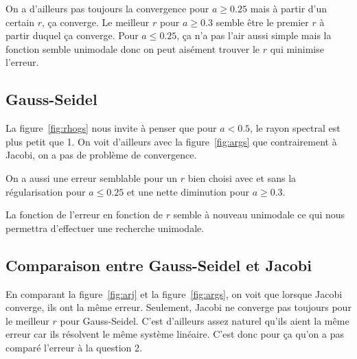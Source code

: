 On a d'ailleurs pas toujours la convergence pour $a \geq 0.25$ mais à partir
d'un certain $r$, ça converge.
Le meilleur $r$ pour $a \geq 0.3$ semble être le premier $r$ à partir duquel
ça converge.
Pour $a \leq 0.25$, ça n'a pas l'air aussi simple mais la fonction semble
unimodale donc on peut aisément trouver le $r$ qui minimise l'erreur.

\subsection{Gauss-Seidel}
La figure~\ref{fig:rhogs} nous invite à penser que pour
$a < 0.5$, le rayon spectral est plus petit que 1.
On voit d'ailleurs avec la figure~\ref{fig:args} que contrairement
à Jacobi, on a pas de problème de convergence.

On a aussi une erreur semblable pour un $r$ bien choisi
avec et sans la régularisation pour $a \leq 0.25$ et une nette
diminution pour $a \geq 0.3$.

La fonction de l'erreur en fonction de $r$ semble à nouveau unimodale
ce qui nous permettra d'effectuer une recherche unimodale.

\subsection{Comparaison entre Gauss-Seidel et Jacobi}
En comparant la figure~\ref{fig:arj} et la figure~\ref{fig:args}, on voit
que lorsque Jacobi converge, ils ont la même erreur.
Seulement, Jacobi ne converge pas toujours pour le meilleur $r$ pour Gauss-Seidel.
C'est d'ailleurs assez naturel qu'ils aient la même erreur car ils résolvent le même
système linéaire.
C'est donc pour ça qu'on a pas comparé l'erreur à la question 2.


